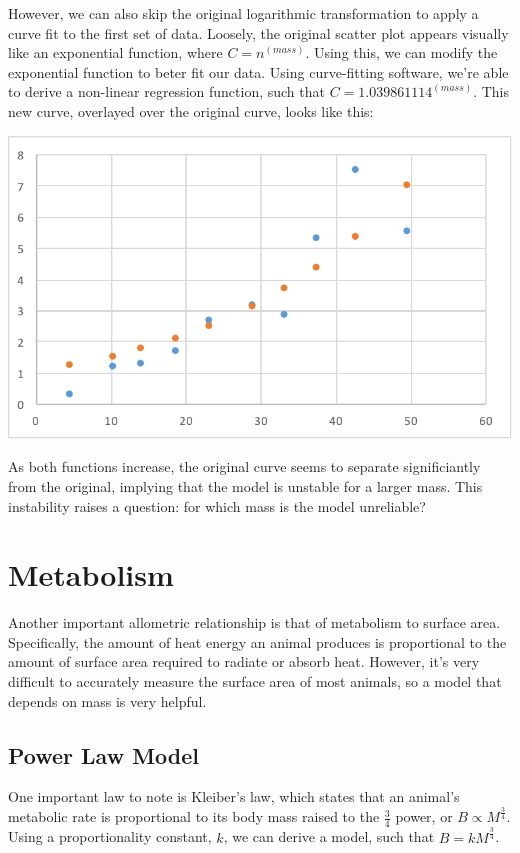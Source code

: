 \documentclass[10pt,letterpaper]{article}
\begin{document}
			However, we can also skip the original logarithmic transformation to apply a curve fit to the first set of data. Loosely, the original scatter plot appears visually like an exponential function, where $C = n^{(mass)}$. Using this, we can modify the exponential function to beter fit our data. Using curve-fitting software, we're able to derive a non-linear regression function, such that $C = 1.039861114^{(mass)}$. This new curve, overlayed over the original curve, looks like this:
			\newline \newline
			\centerline{\includegraphics{Picture12.pdf}}
			\newline \newline
			As both functions increase, the original curve seems to separate significiantly from the original, implying that the model is unstable for a larger mass.
			\newline \newline
			This instability raises a question: for which mass is the model unreliable? 
	\section{Metabolism}
		Another important allometric relationship is that of metabolism to surface area. Specifically, the amount of heat energy an animal produces is proportional to the amount of surface area required to radiate or absorb heat. However, it's very difficult to accurately measure the surface area of most animals, so a model that depends on mass is very helpful. 
		\subsection{Power Law Model}
			One important law to note is Kleiber's law, which states that an animal's metabolic rate is proportional to its body mass raised to the $\frac 3 4$ power, or $B \propto M^{\frac 3 4}$. Using a proportionality constant, $k$, we can derive a model, such that $B = kM^{\frac 3 4}$.
\end{document}
